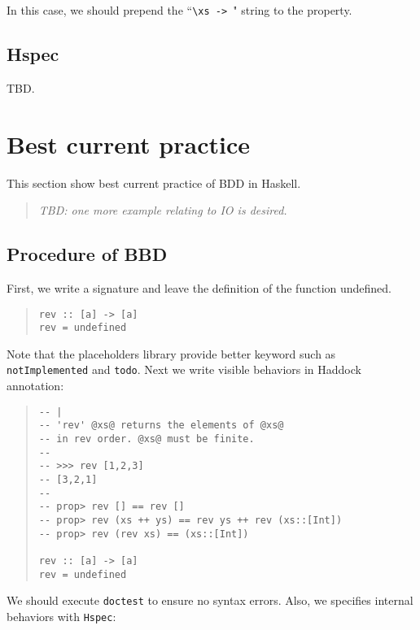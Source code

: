 \documentclass[preprint]{sigplanconf}
\begin{document}
\noindent In this case, we should prepend the ``\verb|\xs -> |" string
to the property.

\subsection{Hspec}
\label{sec:hspec}

TBD.

\section{Best current practice}
\label{ref:Best-current-practice}

This section show best current practice of
BDD in Haskell.

\begin{quote}
    \emph{TBD: one more example relating to IO is desired.}
\end{quote}

\subsection{Procedure of BBD}

First, we write a signature and leave the definition of the function undefined.

\begin{quote}
\small
\begin{verbatim}
rev :: [a] -> [a]
rev = undefined
\end{verbatim}
\end{quote}

\noindent Note that the placeholders library provide better keyword such as {\tt notImplemented} and {\tt todo}.
Next we write visible behaviors in Haddock annotation:

\begin{quote}
\small
\begin{verbatim}
-- |
-- 'rev' @xs@ returns the elements of @xs@
-- in rev order. @xs@ must be finite.
--
-- >>> rev [1,2,3]
-- [3,2,1]
--
-- prop> rev [] == rev []
-- prop> rev (xs ++ ys) == rev ys ++ rev (xs::[Int])
-- prop> rev (rev xs) == (xs::[Int])

rev :: [a] -> [a]
rev = undefined
\end{verbatim}
\end{quote}

\noindent We should execute {\tt doctest} to ensure no syntax errors.
Also, we specifies internal behaviors with {\tt Hspec}:
\end{document}
